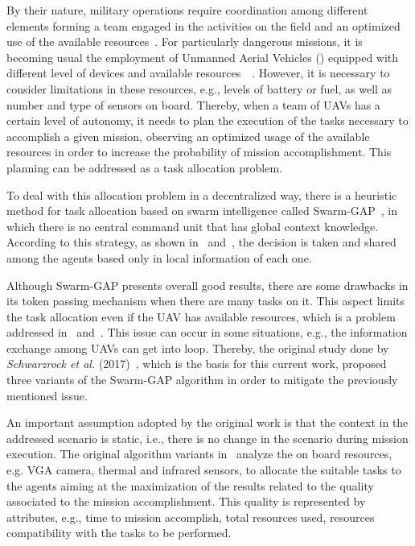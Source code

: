 By their nature, military operations require coordination among different elements forming a team engaged in the activities on the field and an optimized use of the available resources~\cite{CC01}. For particularly dangerous missions, it is becoming usual the employment  of Unmanned Aerial Vehicles (\uav) equipped with different level of devices and available resources~\cite{nonami2010autonomous}~\cite{UAV01}. However, it is necessary to consider limitations in these resources, e.g., levels of battery or fuel, as well as number and type of sensors on board. Thereby, when a team of UAVs has a certain level of autonomy, it needs to plan the execution of the tasks necessary to accomplish a given mission, observing an optimized usage of the available resources in order to increase the probability of mission accomplishment. This planning can be addressed as a task allocation problem.

To deal with this allocation problem in a decentralized way, there is a heuristic method for task allocation based on swarm intelligence called Swarm-GAP~\cite{ferreira2007swarm}, in which there is no central command unit that has global context knowledge. According to this strategy, as shown in~\cite{MOEA07} and~\cite{MOEA05}, the decision is taken and shared among the agents based only in local information of each one.

Although Swarm-GAP presents overall good results, there are some drawbacks in its token passing mechanism when there are many tasks on it. This aspect limits the task allocation even if the UAV has available resources, which is a problem addressed in~\cite{MOEA07} and~\cite{MAS07}. This issue can occur in some situations, e.g., the information exchange among UAVs can get into loop. Thereby, the original study done by \textit{Schwarzrock et al.} (2017)~\cite{MAS07}, which is the basis for this current work, proposed three variants of the Swarm-GAP algorithm in order to mitigate the previously mentioned issue.

An important assumption adopted by the original work is that the context in the addressed scenario is static, i.e., there is no change in the scenario during mission execution. The original algorithm variants in~\cite{MAS07} analyze the on board resources, e.g. VGA camera, thermal and infrared sensors, to allocate the suitable tasks to the agents aiming at the maximization of the results related to the quality associated to the mission accomplishment. This quality is represented by attributes, e.g., time to mission accomplish, total resources used, resources compatibility with the tasks to be performed.

